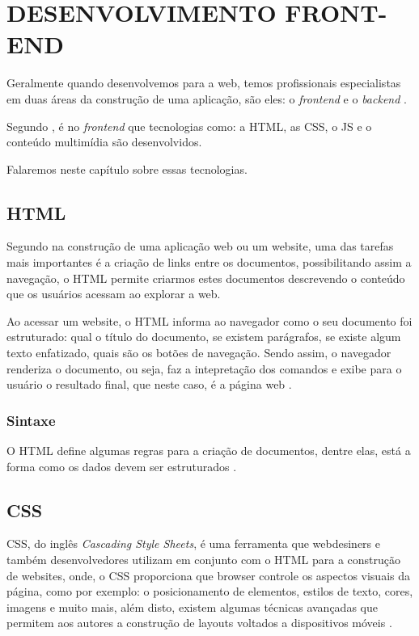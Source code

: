 \chapter{DESENVOLVIMENTO FRONT-END}
\label{desenvolvimentoFrontEnd}

Geralmente quando desenvolvemos para a web, temos profissionais especialistas em
duas áreas da construção de uma aplicação, são eles: o \textit{frontend} e o
\textit{backend} \cite{artigoAvaliacaoEReducaoDoTempoDeRespostaDeSistemasWeb}.

Segundo , é no
\textit{frontend} que tecnologias como: a \ac{HTML}, as \ac{CSS}, o \ac{JS}
e o conteúdo multimídia são desenvolvidos.

Falaremos neste capítulo sobre essas tecnologias.

\section{HTML}

Segundo  na construção de uma aplicação web ou
um website, uma das tarefas mais importantes é a criação de links entre os
documentos, possibilitando assim a navegação, o \acs{HTML} permite criarmos
estes documentos descrevendo o conteúdo que os usuários acessam ao explorar a web.

Ao acessar um website, o \acs{HTML} informa ao navegador como o seu documento
foi estruturado: qual o título do documento, se existem parágrafos, se existe
algum texto enfatizado, quais são os botões de navegação. Sendo assim, o
navegador renderiza o documento, ou seja, faz a intepretação dos
comandos e exibe para o usuário o resultado final, que neste caso, é a página
web \cite{headFirstHTMLWithCSSAndXHTML}.

\subsection{Sintaxe}

O HTML define algumas regras para a criação de documentos, dentre elas, está a
forma como os dados devem ser estruturados \cite{htmlCSSTheGoodParts}.

\section{CSS}

\ac{CSS}, do inglês \textit{Cascading Style Sheets}, é uma ferramenta
que webdesiners e também desenvolvedores utilizam em conjunto com o \ac{HTML}
para a construção de websites, onde, o \acs{CSS} proporciona que \ac{browser}
controle os aspectos visuais da página, como por exemplo: o posicionamento de elementos,
estilos de texto, cores, imagens e muito mais, além disto, existem algumas
técnicas avançadas que permitem aos autores a construção de layouts voltados a
dispositivos móveis \cite{beginningCSSCascadingStyleSheetsForWebDesign}.

